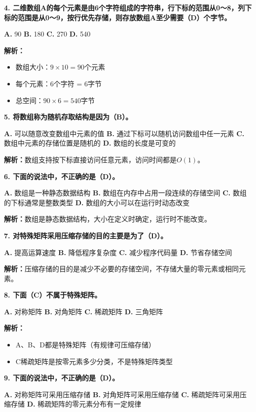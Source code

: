 \documentclass[12pt,a4paper]{amsart}
\begin{document}
\textbf{4. 二维数组A的每个元素是由6个字符组成的字符串，行下标的范围从0～8，列下标的范围是从0～9，按行优先存储，则存放数组A至少需要（D）个字节。}

\textbf{A.} 90
\textbf{B.} 180
\textbf{C.} 270
\textbf{D.} 540

\textbf{解析：}
\begin{itemize}
\item 数组大小：$9 \times 10 = 90$个元素
\item 每个元素：6个字符 = 6字节
\item 总空间：$90 \times 6 = 540$字节
\end{itemize}

\textbf{5. 将数组称为随机存取结构是因为（B）。}

\textbf{A.} 可以随意改变数组中元素的值
\textbf{B.} 通过下标可以随机访问数组中任一元素
\textbf{C.} 数组中元素的存储位置是随机的
\textbf{D.} 数组的长度是可变的

\textbf{解析：}数组支持按下标直接访问任意元素，访问时间都是$O(1)$。

\textbf{6. 下面的说法中，不正确的是（D）。}

\textbf{A.} 数组是一种静态数据结构
\textbf{B.} 数组在内存中占用一段连续的存储空间
\textbf{C.} 数组的下标通常是整数类型
\textbf{D.} 数组的大小可以在运行时动态改变

\textbf{解析：}数组是静态数据结构，大小在定义时确定，运行时不能改变。

\textbf{7. 对特殊矩阵采用压缩存储的目的主要是为了（D）。}

\textbf{A.} 提高运算速度
\textbf{B.} 降低程序复杂度
\textbf{C.} 减少程序代码量
\textbf{D.} 节省存储空间

\textbf{解析：}压缩存储的目的是减少不必要的存储空间，不存储大量的零元素或相同元素。

\textbf{8. 下面（C）不属于特殊矩阵。}

\textbf{A.} 对称矩阵
\textbf{B.} 对角矩阵
\textbf{C.} 稀疏矩阵
\textbf{D.} 三角矩阵

\textbf{解析：}
\begin{itemize}
\item A、B、D都是特殊矩阵（有规律可压缩存储）
\item C稀疏矩阵是按零元素多少分类，不是特殊矩阵类型
\end{itemize}

\textbf{9. 下面的说法中，不正确的是（D）。}

\textbf{A.} 对称矩阵可采用压缩存储
\textbf{B.} 对角矩阵可采用压缩存储
\textbf{C.} 稀疏矩阵可采用压缩存储
\textbf{D.} 稀疏矩阵的零元素分布有一定规律
\end{document}

